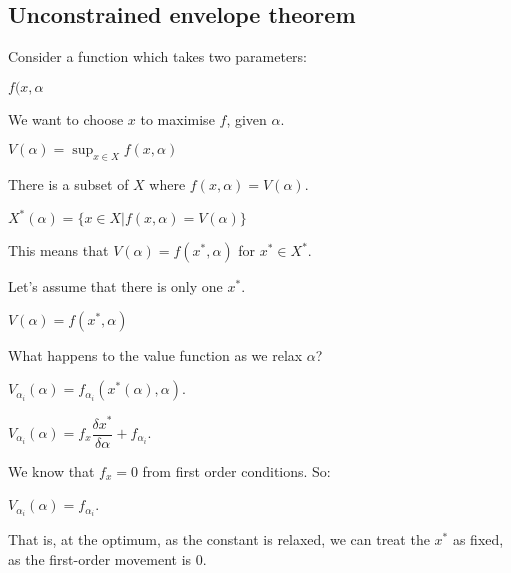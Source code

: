 
\subsection{Unconstrained envelope theorem}

Consider a function which takes two parameters:

\(f(x,\alpha \)

We want to choose \(x\) to maximise \(f\), given \(\alpha \).

\(V(\alpha )=\sup_{x\in X}f(x,\alpha )\)

There is a subset of \(X\) where \(f(x,\alpha )=V(\alpha )\).

\(X^*(\alpha )=\{x\in X|f(x, \alpha )=V(\alpha )\}\)

This means that \(V(\alpha )=f(x^*,\alpha )\) for \(x^*\in X^*\).

Let’s assume that there is only one \(x^*\).

\(V(\alpha )=f(x^*,\alpha )\)

What happens to the value function as we relax \(\alpha\)?

\(V_{\alpha_i}(\alpha )=f_{\alpha_i}(x^*(\alpha ),\alpha )\).

\(V_{\alpha_i}(\alpha )=f_x\dfrac{\delta x^*}{\delta \alpha }+f_{\alpha_i}\).

We know that \(f_x=0\) from first order conditions. So:

\(V_{\alpha_i}(\alpha )= f_{\alpha_i}\).

That is, at the optimum, as the constant is relaxed, we can treat the \(x^*\) as fixed, as the first-order movement is \(0\).

